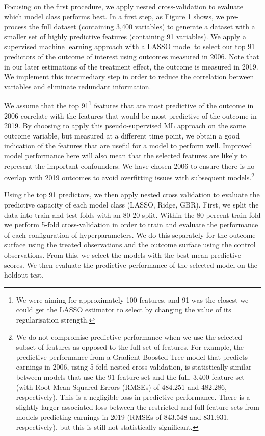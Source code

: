 \documentclass[12pt, a4paper]{article}
\begin{document}
Focusing on the first procedure, we apply nested cross-validation to evaluate
which model class performs best. In a first step, as Figure 1 shows, we
pre-process the full dataset (containing 3,400 variables) to generate a dataset
with a smaller set of highly predictive features (containing 91 variables). We
apply a supervised machine learning approach with a LASSO model to select our
top 91 predictors of the outcome of interest using outcomes measured in 2006.
Note that in our later estimations of the treatment effect, the outcome is
measured in 2019. We implement this intermediary step in order to reduce the
correlation between variables and eliminate redundant information.

We assume that the top 91\footnote{We were aiming for approximately 100
features, and 91 was the closest we could get the LASSO estimator to select by
changing the value of its regularisation strength.} features that are most
predictive of the outcome in 2006 correlate with the features that would be
most predictive of the outcome in 2019. By choosing to apply this
pseudo-supervised ML approach on the same outcome variable, but measured at a
different time point, we obtain a good indication of the features that are
useful for a model to perform well. Improved model performance here will also
mean that the selected features are likely to represent the important
confounders. We have chosen 2006 to ensure there is no overlap with 2019
outcomes to avoid overfitting issues with subsequent models.\footnote{We do not
compromise predictive performance when we use the selected subset of features
as opposed to the full set of features. For example, the predictive performance
from a Gradient Boosted Tree model that predicts earnings in 2006, using 5-fold
nested cross-validation, is statistically similar between models that use the
91 feature set and the full, 3,400 feature set (with Root Mean-Squared Errors
(RMSEs) of 484.251 and 482.286, respectively). This is a negligible loss in
predictive performance. There is a slightly larger associated loss between the
restricted and full feature sets from models predicting earnings in 2019 (RMSEs
of 843.548 and 831.931, respectively), but this is still not statistically
significant.}

Using the top 91 predictors, we then apply nested cross validation to evaluate
the predictive capacity of each model class (LASSO, Ridge, GBR). First, we
split the data into train and test folds with an 80-20 split. Within the 80
percent train fold we perform 5-fold cross-validation in order to train and
evaluate the performance of each configuration of hyperparameters. We do this
separately for the outcome surface using the treated observations and the
outcome surface using the control observations. From this, we select the models
with the best mean predictive scores. We then evaluate the predictive
performance of the selected model on the holdout test.
\end{document}
